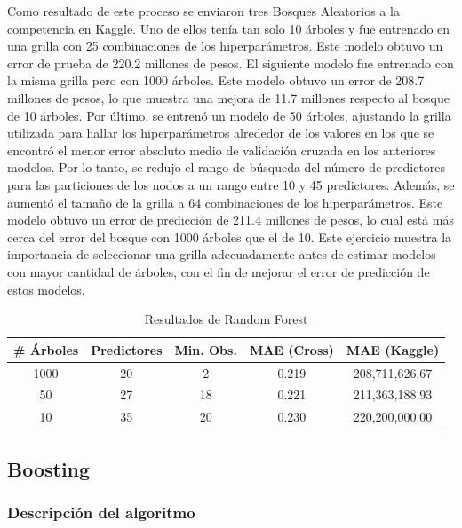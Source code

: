 \documentclass[article,11 pt]{article}
\begin{document}
Como resultado de este proceso se enviaron tres Bosques Aleatorios a la competencia en Kaggle. Uno de ellos tenía tan solo 10 árboles y fue entrenado en una grilla con 25 combinaciones de los hiperparámetros. Este modelo obtuvo un error de prueba de 220.2 millones de pesos. El siguiente modelo fue entrenado con la misma grilla pero con 1000 árboles. Este modelo obtuvo un error de 208.7 millones de pesos, lo que muestra una mejora de 11.7 millones respecto al bosque de 10 árboles. Por último, se entrenó un modelo de 50 árboles, ajustando la grilla utilizada para hallar los hiperparámetros alrededor de los valores en los que se encontró el menor error absoluto medio de validación cruzada en los anteriores modelos. Por lo tanto, se redujo el rango de búsqueda del número de predictores para las particiones de los nodos a un rango entre 10 y 45 predictores. Además, se aumentó el tamaño de la grilla a 64 combinaciones de los hiperparámetros. Este modelo obtuvo un error de predicción de 211.4 millones de pesos, lo cual está más cerca del error del bosque con 1000 árboles que el de 10. Este ejercicio muestra la importancia de seleccionar una grilla adecuadamente antes de estimar modelos con mayor cantidad de árboles, con el fin de mejorar el error de predicción de estos modelos.

\begin{table}[H]
\centering
\caption{Resultados de Random Forest}
\begin{tabular}{ccccc}
\hline
\textbf{\# Árboles} & \textbf{Predictores} & \textbf{Min. Obs.} & \textbf{MAE (Cross)} & \textbf{MAE (Kaggle)} \\
\hline
1000 & 20 & 2  & 0.219 & 208,711,626.67 \\
50   & 27 & 18 & 0.221 & 211,363,188.93 \\
10   & 35 & 20 & 0.230 & 220,200,000.00 \\
\hline
\end{tabular}
\label{tab:random_forest}
\end{table}

\subsection{Boosting}
\subsubsection{Descripción del algoritmo}
\end{document}
